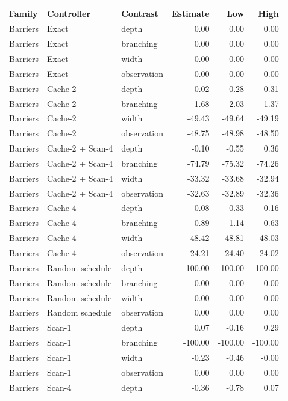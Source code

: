 \begin{longtable}{lllrrr}
\toprule
Family & Controller & Contrast & Estimate & Low & High\\
\midrule
\endhead
Barriers & Exact & depth & 0.00 & 0.00 & 0.00\\
Barriers & Exact & branching & 0.00 & 0.00 & 0.00\\
Barriers & Exact & width & 0.00 & 0.00 & 0.00\\
Barriers & Exact & observation & 0.00 & 0.00 & 0.00\\
Barriers & Cache-2 & depth & 0.02 & -0.28 & 0.31\\
Barriers & Cache-2 & branching & -1.68 & -2.03 & -1.37\\
Barriers & Cache-2 & width & -49.43 & -49.64 & -49.19\\
Barriers & Cache-2 & observation & -48.75 & -48.98 & -48.50\\
Barriers & Cache-2 + Scan-4 & depth & -0.10 & -0.55 & 0.36\\
Barriers & Cache-2 + Scan-4 & branching & -74.79 & -75.32 & -74.26\\
Barriers & Cache-2 + Scan-4 & width & -33.32 & -33.68 & -32.94\\
Barriers & Cache-2 + Scan-4 & observation & -32.63 & -32.89 & -32.36\\
Barriers & Cache-4 & depth & -0.08 & -0.33 & 0.16\\
Barriers & Cache-4 & branching & -0.89 & -1.14 & -0.63\\
Barriers & Cache-4 & width & -48.42 & -48.81 & -48.03\\
Barriers & Cache-4 & observation & -24.21 & -24.40 & -24.02\\
Barriers & Random schedule & depth & -100.00 & -100.00 & -100.00\\
Barriers & Random schedule & branching & 0.00 & 0.00 & 0.00\\
Barriers & Random schedule & width & 0.00 & 0.00 & 0.00\\
Barriers & Random schedule & observation & 0.00 & 0.00 & 0.00\\
Barriers & Scan-1 & depth & 0.07 & -0.16 & 0.29\\
Barriers & Scan-1 & branching & -100.00 & -100.00 & -100.00\\
Barriers & Scan-1 & width & -0.23 & -0.46 & -0.00\\
Barriers & Scan-1 & observation & 0.00 & 0.00 & 0.00\\
Barriers & Scan-4 & depth & -0.36 & -0.78 & 0.07\\

\end{longtable}
